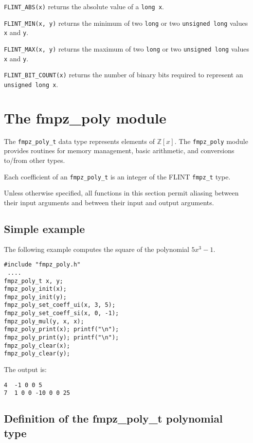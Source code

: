 \documentclass[a4paper,10pt]{article}
\newcommand{\Z}{\mathbb{Z}}
\newcommand{\code}{\lstinline}
\begin{document}
\code{FLINT_ABS(x)} returns the absolute value of a \code{long x}.

\code{FLINT_MIN(x, y)} returns the minimum of two \code{long} or two \code{unsigned long} values \code{x} and \code{y}.

\code{FLINT_MAX(x, y)} returns the maximum of two \code{long} or two \code{unsigned long} values \code{x} and \code{y}.

\code{FLINT_BIT_COUNT(x)} returns the number of binary bits required to represent an \code{unsigned long x}.

\section{The fmpz\_poly module}

The \code{fmpz_poly_t} data type represents elements of $\Z[x]$. The \code{fmpz_poly} module provides routines for memory management, basic arithmetic, and conversions to/from other types.

Each coefficient of an \code{fmpz_poly_t} is an integer of the FLINT \code{fmpz_t} type. 

Unless otherwise specified, all functions in this section permit aliasing between their input arguments and between their input and output arguments. 

\subsection{Simple example}

The following example computes the square of the polynomial $5x^3 - 1$.

\begin{lstlisting}
#include "fmpz_poly.h"
 ....
fmpz_poly_t x, y;
fmpz_poly_init(x);
fmpz_poly_init(y);
fmpz_poly_set_coeff_ui(x, 3, 5);
fmpz_poly_set_coeff_si(x, 0, -1);
fmpz_poly_mul(y, x, x);
fmpz_poly_print(x); printf("\n");
fmpz_poly_print(y); printf("\n");
fmpz_poly_clear(x);
fmpz_poly_clear(y);
\end{lstlisting}

The output is:

\begin{lstlisting}
4  -1 0 0 5
7  1 0 0 -10 0 0 25
\end{lstlisting}

\subsection{Definition of the fmpz\_poly\_t polynomial type}
\end{document}
